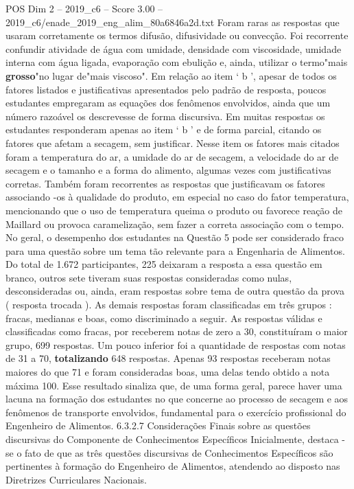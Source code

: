 \begin{textsample}{POS Dim 2 – 2019\_c6 – Score 3.00 – 2019\_c6/enade\_2019\_eng\_alim\_80a6846a2d.txt}
Foram raras as respostas que usaram corretamente os termos difusão, difusividade ou convecção.
Foi recorrente confundir atividade de água com umidade, densidade com viscosidade, umidade interna com água ligada, evaporação com ebulição e, ainda, utilizar o termo"mais \textbf{grosso}"no lugar de"mais viscoso".
Em relação ao item ‘ b ’, apesar de todos os fatores listados e justificativas apresentados pelo padrão de resposta, poucos estudantes empregaram as equações dos fenômenos envolvidos, ainda que um número razoável os descrevesse de forma discursiva.
Em muitas respostas os estudantes responderam apenas ao item ‘ b ’ e de forma parcial, citando os fatores que afetam a secagem, sem justificar.
Nesse item os fatores mais citados foram a temperatura do ar, a umidade do ar de secagem, a velocidade do ar de secagem e o tamanho e a forma do alimento, algumas vezes com justificativas corretas.
Também foram recorrentes as respostas que justificavam os fatores associando -os à qualidade do produto, em especial no caso do fator temperatura, mencionando que o uso de temperatura queima o produto ou favorece reação de Maillard ou provoca caramelização, sem fazer a correta associação com o tempo.
No geral, o desempenho dos estudantes na Questão 5 pode ser considerado fraco para uma questão sobre um tema tão relevante para a Engenharia de Alimentos.
Do total de 1.672 participantes, 225 deixaram a resposta a essa questão em branco, outros sete tiveram suas respostas consideradas como nulas, desconsideradas ou, ainda, eram respostas sobre tema de outra questão da prova ( resposta trocada ).
As demais respostas foram classificadas em três grupos : fracas, medianas e boas, como discriminado a seguir.
As respostas válidas e classificadas como fracas, por receberem notas de zero a 30, constituíram o maior grupo, 699 respostas.
Um pouco inferior foi a quantidade de respostas com notas de 31 a 70, \textbf{totalizando} 648 respostas.
Apenas 93 respostas receberam notas maiores do que 71 e foram consideradas boas, uma delas tendo obtido a nota máxima 100.
Esse resultado sinaliza que, de uma forma geral, parece haver uma lacuna na formação dos estudantes no que concerne ao processo de secagem e aos fenômenos de transporte envolvidos, fundamental para o exercício profissional do Engenheiro de Alimentos. 6.3.2.7 Considerações Finais sobre as questões discursivas do Componente de Conhecimentos Específicos Inicialmente, destaca -se o fato de que as três questões discursivas de Conhecimentos Específicos são pertinentes à formação do Engenheiro de Alimentos, atendendo ao disposto nas Diretrizes Curriculares Nacionais.

\end{textsample}
